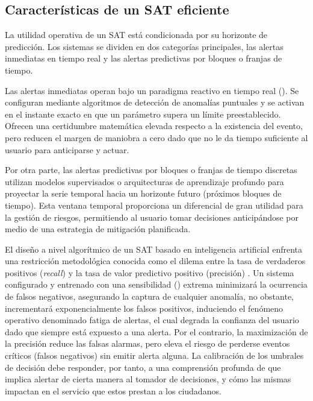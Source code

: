 \subsection{Características de un SAT eficiente}\label{caracteruxedsticas-de-un-sat-eficiente}

La utilidad operativa de un SAT está condicionada por su horizonte de predicción. Los sistemas se dividen en dos categorías principales, las alertas inmediatas en tiempo real y las alertas predictivas por bloques o franjas de tiempo.

Las alertas inmediatas operan bajo un paradigma reactivo en tiempo real (). Se configuran mediante algoritmos de detección de anomalías puntuales y se activan en el instante exacto en que un parámetro supera un límite preestablecido. Ofrecen una certidumbre matemática elevada respecto a la existencia del evento, pero reducen el margen de maniobra a cero dado que no le da tiempo suficiente al usuario para anticiparse y actuar.

Por otra parte, las alertas predictivas por bloques o franjas de tiempo discretas utilizan modelos supervisados o arquitecturas de aprendizaje profundo para proyectar la serie temporal hacia un horizonte futuro (próximos bloques de tiempo). Esta ventana temporal proporciona un diferencial de gran utilidad para la gestión de riesgos, permitiendo al usuario tomar decisiones anticipándose por medio de una estrategia de mitigación planificada.

El diseño a nivel algorítmico de un SAT basado en inteligencia artificial enfrenta una restricción metodológica conocida como el dilema entre la tasa de verdaderos positivos (\emph{recall}) y la tasa de valor predictivo positivo (precisión) \autocite{fawcett2006}.
Un sistema configurado y entrenado con una sensibilidad () extrema minimizará la ocurrencia de falsos negativos, asegurando la captura de cualquier anomalía, no obstante, incrementará exponencialmente los falsos positivos, induciendo el fenómeno operativo denominado fatiga de alertas, el cual degrada la confianza del usuario \autocite{ancker2017} dado que siempre está expuesto a una alerta. Por el contrario, la maximización de la precisión reduce las falsas alarmas, pero eleva el riesgo de perderse eventos críticos (falsos negativos) sin emitir alerta alguna. La calibración de los umbrales de decisión debe responder, por tanto, a una comprensión profunda de que implica alertar de cierta manera al tomador de decisiones, y cómo las mismas impactan en el servicio que estos prestan a los ciudadanos.

